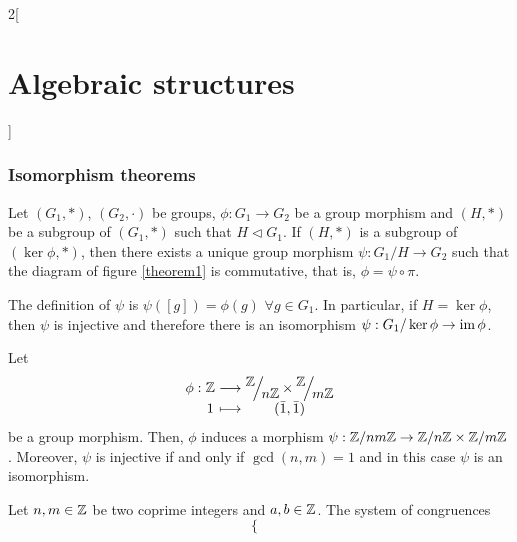 \documentclass[../../../main.tex]{subfiles}
\begin{document}
\begin{multicols}{2}[\section{Algebraic structures}]
    \subsubsection{Isomorphism theorems}
    \begin{theorem}
        Let $(G_1,*)$, $(G_2,\cdot)$ be groups, $\phi:G_1\rightarrow G_2$ be a group morphism and $(H,*)$ be a subgroup of $(G_1,*)$ such that $H\lhd G_1$. If $(H,*)$ is a subgroup of $(\ker\phi,*)$, then there exists a unique group morphism $\psi:G_1/H\rightarrow G_2$ such that the diagram of figure \ref{theorem1} is commutative, that is, $\phi=\psi\circ\pi$.
        \begin{center}
            \begin{minipage}{\linewidth}
                \centering
                
                \label{theorem1}
            \end{minipage}
        \end{center}
        The definition of $\psi$ is $\psi([g])=\phi(g)$ $\forall g\in G_1$.
        In particular, if $H=\ker\phi$, then $\psi$ is injective and therefore there is an isomorphism $\psi:G_1/\ker\phi\rightarrow\im\phi$.
    \end{theorem}
    \begin{theorem}
        Let
        \begin{equation*}
            \begin{array}{r@{\hspace{0.5\tabcolsep}}c@{\hspace{0.5\tabcolsep}}c@{\hspace{0.5\tabcolsep}}c}
                \phi: & \ZZ & \longrightarrow & \displaystyle\quot{\ZZ }{n\ZZ }\times\quot{\ZZ }{m\ZZ } \\
                      & 1   & \longmapsto     & (\Bar{1},\Bar{1})
            \end{array}
        \end{equation*}
        be a group morphism. Then, $\phi$ induces a morphism $\psi:\ZZ /nm\ZZ \rightarrow\ZZ /n\ZZ \times\ZZ /m\ZZ $. Moreover, $\psi$ is injective if and only if $\gcd(n,m)=1$ and in this case $\psi$ is an isomorphism.
    \end{theorem}
    \begin{corollary}
        Let $n,m\in\ZZ $ be two coprime integers and $a,b\in\ZZ $. The system of congruences $$\left\{\begin{array}{l}

\end{array}$$
\end{corollary}
\end{multicols}
\end{document}
